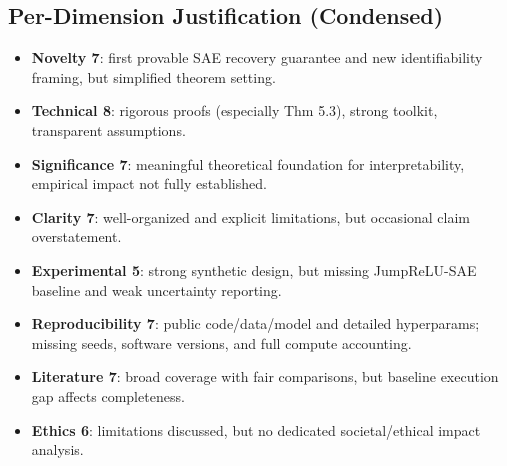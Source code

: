 \documentclass[11pt,a4paper]{article}
\begin{document}
\subsection*{Per-Dimension Justification (Condensed)}
\begin{itemize}[leftmargin=*]
\item \textbf{Novelty 7}: first provable SAE recovery guarantee and new identifiability framing, but simplified theorem setting.
\item \textbf{Technical 8}: rigorous proofs (especially Thm 5.3), strong toolkit, transparent assumptions.
\item \textbf{Significance 7}: meaningful theoretical foundation for interpretability, empirical impact not fully established.
\item \textbf{Clarity 7}: well-organized and explicit limitations, but occasional claim overstatement.
\item \textbf{Experimental 5}: strong synthetic design, but missing JumpReLU-SAE baseline and weak uncertainty reporting.
\item \textbf{Reproducibility 7}: public code/data/model and detailed hyperparams; missing seeds, software versions, and full compute accounting.
\item \textbf{Literature 7}: broad coverage with fair comparisons, but baseline execution gap affects completeness.
\item \textbf{Ethics 6}: limitations discussed, but no dedicated societal/ethical impact analysis.
\end{itemize}
\end{document}
